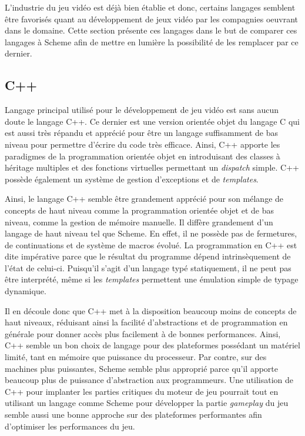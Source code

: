 \documentclass[12pt,oneside,letterpaper,francais]{book}
\begin{document}
L'industrie du jeu vidéo est déjà bien établie et donc, certains
langages semblent être favorisés quant au développement de jeux vidéo
par les compagnies oeuvrant dans le domaine. Cette section présente
ces langages dans le but de comparer ces langages à Scheme afin de
mettre en lumière la possibilité de les remplacer par ce dernier.

\subsection{C++}
Langage principal utilisé pour le développement de jeu vidéo est sans
aucun doute le langage C++. Ce dernier est une version orientée objet
du langage C qui est aussi très répandu et apprécié pour être un
langage suffisamment de bas niveau pour permettre d'écrire du code
très efficace. Ainsi, C++ apporte les paradigmes de la programmation
orientée objet en introduisant des classes à héritage multiples et des
fonctions virtuelles permettant un \textit{dispatch} simple. C++
possède également un système de gestion d'exceptions et de
\textit{templates}. 

Ainsi, le langage C++ semble être grandement apprécié pour son mélange
de concepts de haut niveau comme la programmation orientée objet et de
bas niveau, comme la gestion de mémoire manuelle. Il diffère
grandement d'un langage de haut niveau tel que Scheme. En effet, il ne
possède pas de fermetures, de continuations et de système de macros
évolué. La programmation en C++ est dite impérative parce que le
résultat du programme dépend intrinsèquement de l'état de
celui-ci. Puisqu'il s'agit d'un langage typé statiquement, il ne peut
pas être interprété, même si les \textit{templates} permettent une
émulation simple de typage dynamique.

Il en découle donc que C++ met à la disposition beaucoup moins de
concepts de haut niveaux, réduisant ainsi la facilité d'abstractions
et de programmation en générale pour donner accès plus facilement à de
bonnes performances. Ainsi, C++ semble un bon choix de langage pour
des plateformes possédant un matériel limité, tant en mémoire que
puissance du processeur. Par contre, sur des machines plus puissantes,
Scheme semble plus approprié parce qu'il apporte beaucoup plus de
puissance d'abstraction aux programmeurs. Une utilisation de C++ pour
implanter les parties critiques du moteur de jeu pourrait tout en
utilisant un langage comme Scheme pour développer la partie
\textit{gameplay} du jeu semble aussi une bonne approche sur des
plateformes performantes afin d'optimiser les performances du jeu.
\end{document}
